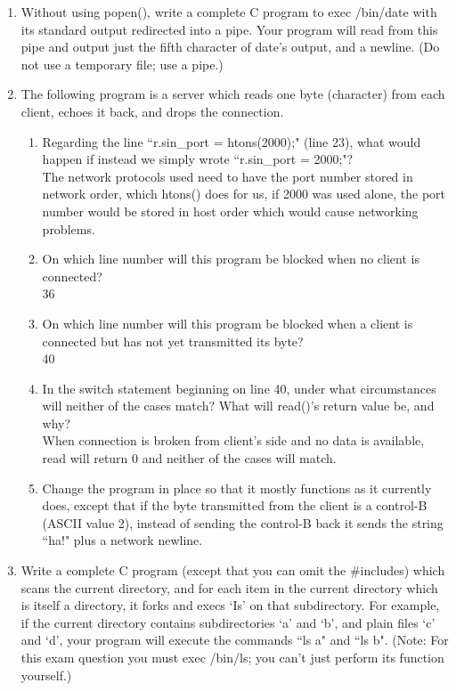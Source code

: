 \documentclass[11pt]{article}
\begin{document}
\begin{enumerate}
			\newpage
			\item Without using popen(), write a complete C program to exec /bin/date with its standard output redirected into a pipe. Your program will read from this pipe and output just the fifth character of date's output, and a newline. (Do not use a temporary file; use a pipe.)
				

			\newpage
			\item The following program is a server which reads one byte (character) from each client, echoes it
			back, and drops the connection.
				
			\newpage
			\begin{enumerate}
				\item  Regarding the line ``r.sin\_port = htons(2000);" (line 23), what would happen if instead we simply wrote ``r.sin\_port = 2000;"?\\
					The network protocols used need to have the port number stored in network order, which htons() does for us, if 2000 was used alone, the port number would be stored in host order which would cause networking problems.
				\item On which line number will this program be blocked when no client is connected?\\
					36
				\item On which line number will this program be blocked when a client is connected but has not yet transmitted its byte?\\
					40
				\item In the switch statement beginning on line 40, under what circumstances will neither of the cases match? What will read()'s return value be, and why?\\
					When connection is broken from client's side and no data is available, read will return 0 and neither of the cases will match.
				\item Change the program in place so that it mostly functions as it currently does, except that if the byte transmitted from the client is a control-B (ASCII value 2), instead of sending the control-B back it sends the string ``ha!" plus a network newline.
					
			\end{enumerate}

		\newpage
		\item Write a complete C program (except that you can omit the \#includes) which scans the current directory, and for each item in the current directory which is itself a directory, it forks and execs `Is' on that subdirectory. For example, if the current directory contains subdirectories `a' and `b', and plain files `c' and `d', your program will execute the commands ``ls a" and ``ls b".
		(Note: For this exam question you must exec /bin/ls; you can't just perform its function yourself.)
			


\end{enumerate}
\end{document}
